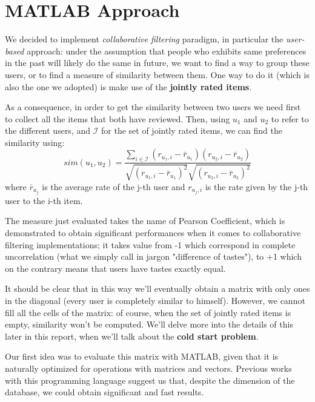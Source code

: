 \section{MATLAB Approach}

We decided to implement \textit{collaborative filtering} paradigm, in particular the \textit{user-based} approach: under the assumption that people who exhibits same preferences in the past will likely do the same in future, we want to find a way to group these users, or to find a measure of similarity between them. One way to do it (which is also the one we adopted) is make use of the \textbf{jointly rated items}. 

As a consequence, in order to get the similarity between two users we need first to collect all the items that both have reviewed. Then, using $u_1$ and $u_2$ to refer to the different users, and $\mathcal{I}$ for the set of jointly rated items, we can find the similarity using:
\begin{equation}
	sim(u_1,u_2) = \frac{\sum_{i \in \mathcal{I}} (r_{u_1,i}-\bar{r}_{u_1}) (r_{u_2,i}-\bar{r}_{u_2})} {\sqrt{(r_{u_1,i}-\bar{r}_{u_1})^2}\sqrt{(r_{u_2,i}-\bar{r}_{u_2})^2}}
	\label{eq_1}
\end{equation}
where $\bar{r}_{u_j}$ is the average rate of the j-th user and $r_{u_j,i}$ is the rate given by the j-th user to the i-th item.

The measure just evaluated takes the name of Pearson Coefficient, which is demonstrated to obtain significant performances when it comes to collaborative filtering implementations; it takes value from -1 which correspond in complete uncorrelation (what we simply call in jargon "difference of tastes"), to +1 which on the contrary means that users have tastes exactly equal.
 
It should be clear that in this way we'll eventually obtain a matrix with only ones in the diagonal (every user is completely similar to himself). However, we cannot fill all the cells of the matrix: of course, when the set of jointly rated items is empty, similarity won't be computed. We'll delve more into the details of this later in this report, when we'll talk about the \textbf{cold start problem}.     

Our first idea was to evaluate this matrix with MATLAB, given that it is naturally optimized for operations with matrices and vectors. Previous works with this programming language suggest us that, despite the dimension of the database, we could obtain significant and fast results.

